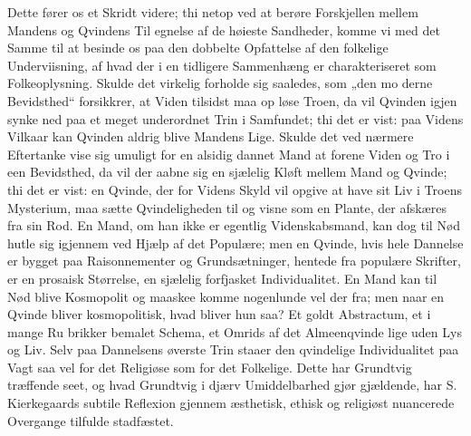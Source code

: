 \documentclass[12pt]{book}
\newcommand{\opage}[1]{\marginnote{\footnotesize\textit{[#1]}}}
\begin{document}
Dette fører os et Skridt videre; thi netop ved at
berøre Forskjellen mellem Mandens og Qvindens Til\-%
egnelse af de høieste Sandheder, komme vi med det
Samme til at besinde os paa den dobbelte Opfattelse af
den folkelige Underviisning, af hvad der i en tidligere
Sammenhæng er charakteriseret som Folkeoplysning.
Skulde det virkelig forholde sig saaledes, som „den mo\-%
derne Bevidsthed“ forsikkrer, at Viden tilsidst maa op\-%
løse Troen, da vil Qvinden igjen synke ned paa et
meget underordnet Trin i Samfundet; thi det er vist:
paa Videns Vilkaar kan Qvinden aldrig blive Mandens
Lige. Skulde det ved nærmere Eftertanke vise sig
umuligt for en alsidig dannet Mand at forene Viden og
Tro i een Bevidsthed, da vil der aabne sig en sjælelig
Kløft mellem Mand og Qvinde; thi det er vist: en
Qvinde, der for Videns Skyld vil opgive at have sit
Liv i Troens Mysterium, maa sætte Qvindeligheden til
og visne som en Plante, der afskæres fra sin Rod.
En Mand, om han ikke er egentlig Videnskabsmand,
kan dog til Nød hutle sig igjennem ved Hjælp af det
Populære; men en Qvinde, hvis hele Dannelse er bygget
paa Raisonnementer og Grundsætninger, hentede fra
populære Skrifter, er en prosaisk Størrelse, en sjælelig
forfjasket Individualitet. En Mand kan til Nød blive
Kosmopolit og maaskee komme nogenlunde vel der\-%
\opage{286}\setcounter{footnote}{0}%
fra; men naar en Qvinde bliver kosmopolitisk, hvad
bliver hun saa? Et goldt Abstractum, et i mange Ru\-%
brikker bemalet Schema, et Omrids af det Almeenqvinde\-%
lige uden Lys og Liv. Selv paa Dannelsens øverste
Trin staaer den qvindelige Individualitet paa Vagt saa\-%
vel for det Religiøse som for det Folkelige. Dette har
Grundtvig træffende seet, og hvad Grundtvig i djærv
Umiddelbarhed gjør gjældende, har S. Kierkegaards
subtile Reflexion gjennem æsthetisk, ethisk og religiøst
nuancerede Overgange tilfulde stadfæstet.
\end{document}
